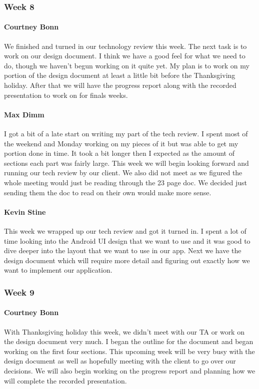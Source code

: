 		\subsubsection{Week 8}
		
			\paragraph{Courtney Bonn}
			We finished and turned in our technology review this week. The next task is to work on our design document. I think we have a good feel for what we need to do, though we haven't begun working on it quite yet. My plan is to work on my portion of the design document at least a little bit before the Thanksgiving holiday. After that we will have the progress report along with the recorded presentation to work on for finals weeks.

			\paragraph{Max Dimm}
			I got a bit of a late start on writing my part of the tech review. I spent most of the weekend and Monday working on my pieces of it but was able to get my portion done in time. It took a bit longer then I expected as the amount of sections each part was fairly large. This week we will begin looking forward and running our tech review by our client. We also did not meet as we figured the whole meeting would just be reading through the 23 page doc. We decided just sending them the doc to read on their own would make more sense.
			
			\paragraph{Kevin Stine}
			This week we wrapped up our tech review and got it turned in. I spent a lot of time looking into the Android UI design that we want to use and it was good to dive deeper into the layout that we want to use in our app. Next we have the design document which will require more detail and figuring out exactly how we want to implement our application.
		
		\subsubsection{Week 9}
		
			\paragraph{Courtney Bonn}
			With Thanksgiving holiday this week, we didn't meet with our TA or work on the design document very much. I began the outline for the document and began working on the first four sections. This upcoming week will be very busy with the design document as well as hopefully meeting with the client to go over our decisions. We will also begin working on the progress report and planning how we will complete the recorded presentation.

